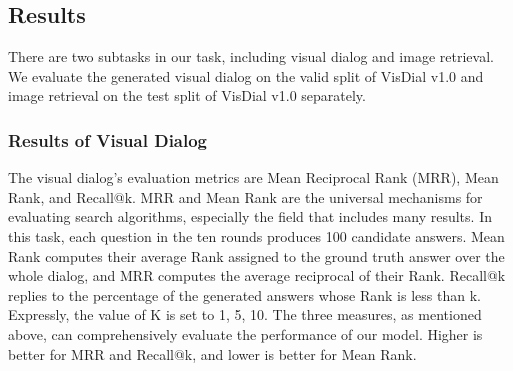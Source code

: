 \documentclass[review]{elsarticle}
\begin{document}
	\subsection{Results}
	There are two subtasks in our task, including visual dialog and image retrieval. We evaluate the generated visual dialog on the valid split of VisDial v1.0 and image retrieval on the test split of VisDial v1.0 separately. 
	
	\subsubsection{Results of Visual Dialog}
	The visual dialog's evaluation metrics are Mean Reciprocal Rank (MRR), Mean Rank, and Recall@k. MRR and Mean Rank are the universal mechanisms for evaluating search algorithms, especially the field that includes many results. 
	In this task, each question in the ten rounds produces 100 candidate answers. Mean Rank computes their average Rank assigned to the ground truth answer over the whole dialog, and MRR computes the average reciprocal of their Rank. Recall@k replies to the percentage of the generated answers whose Rank is less than k. 
	Expressly, the value of K is set to 1, 5, 10. The three measures, as mentioned above, can comprehensively evaluate the performance of our model. Higher is better for MRR and Recall@k, and lower is better for Mean Rank.
	
\end{document}
